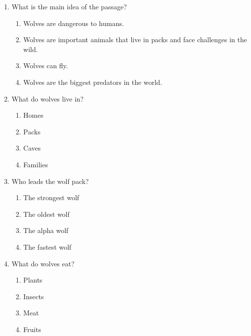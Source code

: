 \documentclass[12pt]{article}
\begin{document}
\begin{enumerate}

    \item What is the main idea of the passage?

    \begin{enumerate}[label=\Alph*.]
        \item Wolves are dangerous to humans.
        \item Wolves are important animals that live in packs and face challenges in the wild.
        \item Wolves can fly.
        \item Wolves are the biggest predators in the world.
    \end{enumerate}

    \vspace{0.5cm}

    \item What do wolves live in?

    \begin{enumerate}[label=\Alph*.]
        \item Homes
        \item Packs
        \item Caves
        \item Families
    \end{enumerate}

    \vspace{0.5cm}

    \item Who leads the wolf pack?

    \begin{enumerate}[label=\Alph*.]
        \item The strongest wolf
        \item The oldest wolf
        \item The alpha wolf
        \item The fastest wolf
    \end{enumerate}

    \vspace{0.5cm}

    \item What do wolves eat?

    \begin{enumerate}[label=\Alph*.]
        \item Plants
        \item Insects
        \item Meat
        \item Fruits
    \end{enumerate}


\end{enumerate}
\end{document}

